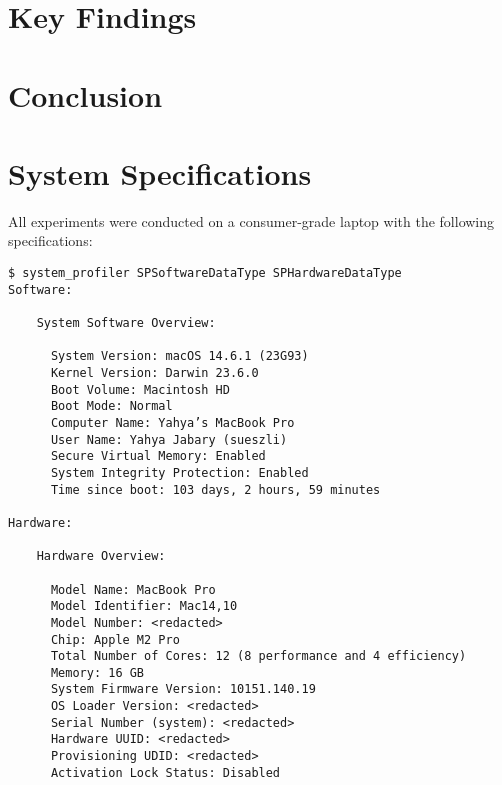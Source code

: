 \documentclass[manuscript]{acmart}
\begin{document}
\section{Key Findings}

\section{Conclusion}









\appendix

\section{System Specifications}

All experiments were conducted on a consumer-grade laptop with the following specifications:

\begin{footnotesize}
\begin{verbatim}
$ system_profiler SPSoftwareDataType SPHardwareDataType
Software:

    System Software Overview:

      System Version: macOS 14.6.1 (23G93)
      Kernel Version: Darwin 23.6.0
      Boot Volume: Macintosh HD
      Boot Mode: Normal
      Computer Name: Yahya’s MacBook Pro
      User Name: Yahya Jabary (sueszli)
      Secure Virtual Memory: Enabled
      System Integrity Protection: Enabled
      Time since boot: 103 days, 2 hours, 59 minutes

Hardware:

    Hardware Overview:

      Model Name: MacBook Pro
      Model Identifier: Mac14,10
      Model Number: <redacted>
      Chip: Apple M2 Pro
      Total Number of Cores: 12 (8 performance and 4 efficiency)
      Memory: 16 GB
      System Firmware Version: 10151.140.19
      OS Loader Version: <redacted>
      Serial Number (system): <redacted>
      Hardware UUID: <redacted>
      Provisioning UDID: <redacted>
      Activation Lock Status: Disabled
\end{verbatim}
\end{footnotesize}
\end{document}
